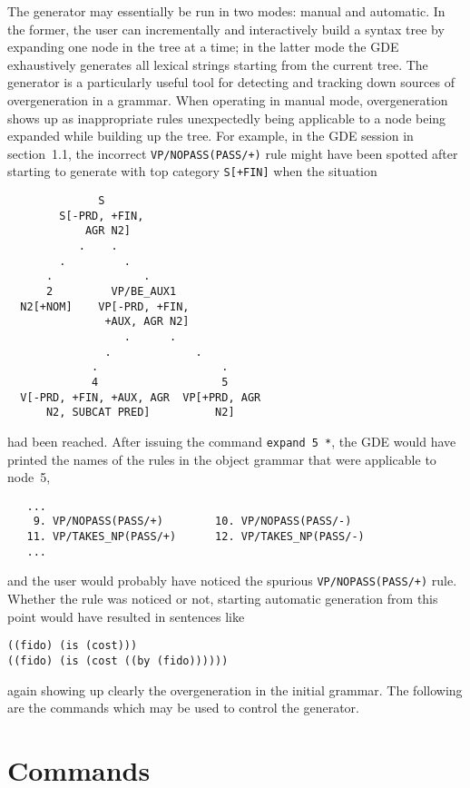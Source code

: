 The generator may essentially be run in two modes: manual and automatic. In
the former, the user can incrementally and interactively build a syntax
tree by expanding one node in the tree at a time; in the latter mode the GDE
exhaustively generates all lexical strings starting from the current
tree. The generator is a particularly useful tool
for detecting and tracking down sources of overgeneration in a grammar.
When operating in manual mode, overgeneration shows up as inappropriate
rules unexpectedly being applicable to a node being expanded while
building up the tree. For example, in the GDE session in section~1.1,
the incorrect {\tt VP/NOPASS(PASS/+)} rule might have been
spotted after starting to generate with top category {\tt S[+FIN]} when the
situation
\begin{ex}
\begin{verbatim}
              S
        S[-PRD, +FIN,
            AGR N2]
           .    .
        .         .
      .              .
      2         VP/BE_AUX1
  N2[+NOM]    VP[-PRD, +FIN,
               +AUX, AGR N2]
                  .      .
               .             .
             .                   .
             4                   5
  V[-PRD, +FIN, +AUX, AGR  VP[+PRD, AGR
      N2, SUBCAT PRED]          N2]
\end{verbatim}
\end{ex}
had been reached. After issuing the command {\tt expand~5~*}, the GDE
would have printed the names of the rules in the object grammar that
were applicable to node~5,
\begin{ex}
\begin{verbatim}
   ...
    9. VP/NOPASS(PASS/+)        10. VP/NOPASS(PASS/-)
   11. VP/TAKES_NP(PASS/+)      12. VP/TAKES_NP(PASS/-)
   ...
\end{verbatim}
\end{ex}
and the user would probably have noticed the spurious
{\tt VP/NOPASS(PASS/+)} rule. Whether the rule was noticed or not,
starting automatic generation from this point would have resulted in
sentences like
\begin{ex}
\begin{verbatim}
((fido) (is (cost)))
((fido) (is (cost ((by (fido))))))
\end{verbatim}
\end{ex}
again showing up clearly the overgeneration in the initial grammar.
The following are the commands which may be used to control the generator.

\section{Commands}

